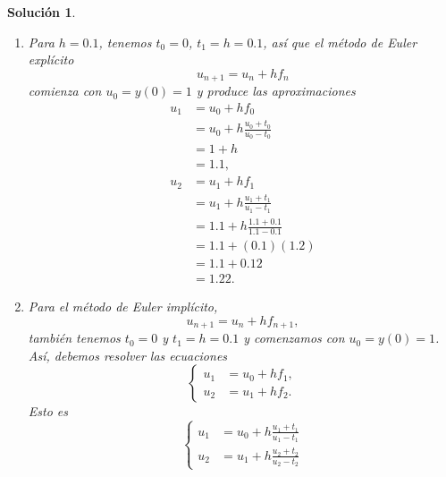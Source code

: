 \documentclass[11pt,letterpaper]{article}
\newtheorem*{sol}{Solución}
\begin{document}
\begin{sol}
  \begin{enumerate}
    \item
      Para $h=0.1$, tenemos $t_0=0$, $t_1=h=0.1$, así que el método de
      Euler explícito
      \begin{equation}
        u_{n+1} = u_n + hf_n
      \end{equation}
      comienza con $u_0=y(0)=1$ y produce las aproximaciones
      \begin{align}
        u_1
        &= u_0+hf_0 \\
        &= u_0+h \frac{u_0+t_0}{u_0-t_0} \\
        &= 1+h \\
        &= 1.1,
        \\
        u_2
        &= u_1+hf_1 \\
        &= u_1+h \frac{u_1+t_1}{u_1-t_1} \\
        &= 1.1+h \frac{1.1+0.1}{1.1-0.1} \\
        &= 1.1+(0.1)(1.2) \\
        &= 1.1 + 0.12 \\
        &= 1.22
      .\end{align}
    \item
      Para el método de Euler implícito,
      \begin{equation}
        u_{n+1} = u_n + hf_{n+1}
      ,\end{equation}
      también tenemos $t_0=0$ y
      $t_1=h=0.1$ y comenzamos con $u_0=y(0)=1$.
      Así, debemos resolver las ecuaciones
      \begin{equation}
        \left\{
          \begin{aligned}
            u_1 &= u_0 + hf_{1},
            \\
            u_2 &= u_1 + hf_{2}.
          \end{aligned}
        \right.
      \end{equation}
      Esto es
      \begin{equation}
        \left\{
          \begin{aligned}
            u_1 &= u_0 + h \frac{u_1+t_1}{u_1-t_1}
            \\
            u_2 &= u_1 + h \frac{u_2+t_2}{u_2-t_2}
          \end{aligned}
        \right.
      \end{equation}
      
      
  \end{enumerate}
\end{sol}
\end{document}
